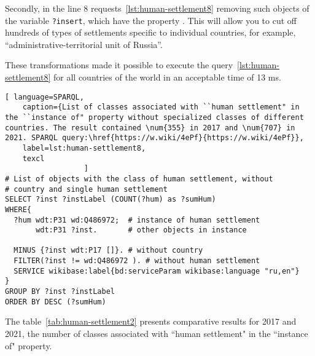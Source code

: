 Secondly, in the line \num{8} requests~\ref{lst:human-settlement8}
removing such objects of the variable \lstinline|?insert|, 
which have the property . 
This will allow you to cut off hundreds of types of settlements specific to individual countries, 
for example, ``administrative-territorial unit of Russia''.

These transformations made it possible to execute the query~\ref{lst:human-settlement8}
for all countries of the world in an acceptable time of 13 ms.

\begin{lstlisting}[ language=SPARQL, 
    caption={List of classes associated with ``human settlement" in the ``instance of" property without specialized classes of different countries. The result contained \num{355} in 2017 and \num{707} in 2021. SPARQL query:\href{https://w.wiki/4ePf}{https://w.wiki/4ePf}}, 
    label=lst:human-settlement8,
    texcl 
                  ]
# List of objects with the class of human settlement, without 
# country and single human settlement
SELECT ?inst ?instLabel (COUNT(?hum) as ?sumHum) 
WHERE{ 
  ?hum wdt:P31 wd:Q486972;  # instance of human settlement
       wdt:P31 ?inst.       # other objects in instance
  
  MINUS {?inst wdt:P17 []}. # without country
  FILTER(?inst != wd:Q486972 ). # without human settlement
  SERVICE wikibase:label{bd:serviceParam wikibase:language "ru,en"}
}  
GROUP BY ?inst ?instLabel
ORDER BY DESC (?sumHum)
\end{lstlisting}%

The table~\ref{tab:human-settlement2} presents
comparative results for 2017 and 2021,
the number of classes associated with ``human settlement" in the ``instance of" property.

